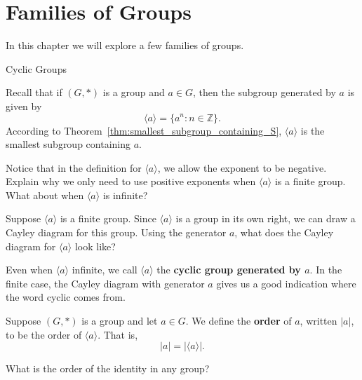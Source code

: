 \chapter{Families of Groups}
\label{chapter:families}
\thispagestyle{empty}

In this chapter we will explore a few families of groups.

\begin{section}{Cyclic Groups}

Recall that if \((G,*)\) is a group and \(a\in G\), then the subgroup generated by \(a\) is given by
\[
\langle a\rangle =\{a^n:n\in\mathbb{Z}\}.
\]
According to Theorem~\ref{thm:smallest_subgroup_containing_S}, \(\langle a\rangle\) is the smallest subgroup containing \(a\).  

\begin{exercise}\label{exer:finite_pos_exps}
Notice that in the definition for \(\langle a\rangle\), we allow the exponent to be negative.  Explain why we only need to use positive exponents when \(\langle a\rangle\) is a finite group.  What about when \(\langle a\rangle\) is infinite?
\end{exercise}

\begin{exercise}
Suppose \(\langle a\rangle\) is a finite group.  Since \(\langle a\rangle\) is a group in its own right, we can draw a Cayley diagram for this group.  Using the generator \(a\), what does the Cayley diagram for \(\langle a\rangle\) look like?
\end{exercise}

Even when \(\langle a\rangle\) infinite, we call \(\langle a\rangle\) the \textbf{cyclic group generated by \(a\)}.  In the finite case, the Cayley diagram with generator \(a\) gives us a good indication where the word cyclic comes from.

\begin{definition}
Suppose \((G,*)\) is a group and let \(a\in G\).  We define the \textbf{order} of \(a\), written \(|a|\), to be the order of \(\langle a\rangle\).  That is,
\[
|a|=|\langle a\rangle|.
\]
\end{definition}

\begin{exercise}
What is the order of the identity in any group?
\end{exercise}


\end{section}

